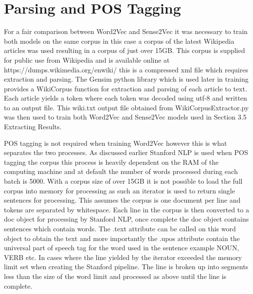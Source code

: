 \section{Parsing and POS Tagging}
For a fair comparison between Word2Vec and Sense2Vec it was necessary to train both models on the same corpus in this case a corpus of the latest Wikipedia articles was used resulting in a corpus of just over 15GB. This corpus is supplied for public use from Wikipedia and is available online at https://dumps.wikimedia.org/enwiki/ this is a compressed xml file which requires extraction and parsing. The Gensim python library which is used later in training provides a WikiCorpus function for extraction and parsing of each article to text. Each article yields a token where each token was decoded using utf-8 and written to an output file. This wiki.txt output file obtained from WikiCorpusExtractor.py was then used to train both Word2Vec and Sense2Vec models used in Section 3.5 Extracting Results.

POS tagging is not required when training Word2Vec however this is what separates the two processes. As discussed earlier Stanford NLP is used when POS tagging the corpus this process is heavily dependent on the RAM of the computing machine and at default the number of words processed during each batch is 5000. With a corpus size of over 15GB it is not possible to load the full corpus into memory for processing as such an iterator is used to return single sentences for processing. This assumes the corpus is one document per line and tokens are separated by whitespace. Each line in the corpus is then converted to a doc object for processing by Stanford NLP, once complete the doc object contains sentences which contain words. The .text attribute can be called on this word object to obtain the text and more importantly the .upos attribute contain the universal part of speech tag for the word used in the sentence example NOUN, VERB etc. In cases where the line yielded by the iterator exceeded the memory limit set when creating the Stanford pipeline. The line is broken up into segments less than the size of the word limit and processed as above until the line is complete.

